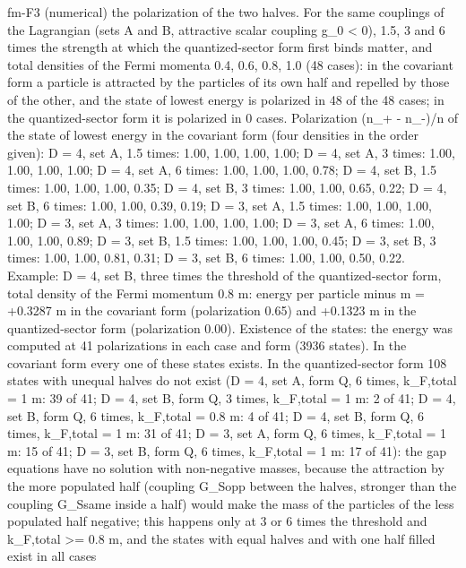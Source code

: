 \documentclass[
  10pt,
]{article}
\newenvironment{Shaded}{}{}
\newcommand{\NormalTok}[1]{#1}
\begin{document}
\begin{Shaded}
\begin{Highlighting}[]
\NormalTok{[PASS] fm{-}F3  (numerical) the polarization of the two halves. For the same couplings of the Lagrangian (sets A and B, attractive scalar coupling g\_0 \textless{} 0), 1.5, 3 and 6 times the strength at which the quantized{-}sector form first binds matter, and total densities of the Fermi momenta 0.4, 0.6, 0.8, 1.0 (48 cases): in the covariant form a particle is attracted by the particles of its own half and repelled by those of the other, and the state of lowest energy is polarized in 48 of the 48 cases; in the quantized{-}sector form it is polarized in 0 cases. Polarization (n\_+ {-} n\_{-})/n of the state of lowest energy in the covariant form (four densities in the order given): D = 4, set A, 1.5 times: 1.00, 1.00, 1.00, 1.00; D = 4, set A, 3 times: 1.00, 1.00, 1.00, 1.00; D = 4, set A, 6 times: 1.00, 1.00, 1.00, 0.78; D = 4, set B, 1.5 times: 1.00, 1.00, 1.00, 0.35; D = 4, set B, 3 times: 1.00, 1.00, 0.65, 0.22; D = 4, set B, 6 times: 1.00, 1.00, 0.39, 0.19; D = 3, set A, 1.5 times: 1.00, 1.00, 1.00, 1.00; D = 3, set A, 3 times: 1.00, 1.00, 1.00, 1.00; D = 3, set A, 6 times: 1.00, 1.00, 1.00, 0.89; D = 3, set B, 1.5 times: 1.00, 1.00, 1.00, 0.45; D = 3, set B, 3 times: 1.00, 1.00, 0.81, 0.31; D = 3, set B, 6 times: 1.00, 1.00, 0.50, 0.22. Example: D = 4, set B, three times the threshold of the quantized{-}sector form, total density of the Fermi momentum 0.8 m: energy per particle minus m = +0.3287 m in the covariant form (polarization 0.65) and +0.1323 m in the quantized{-}sector form (polarization 0.00). Existence of the states: the energy was computed at 41 polarizations in each case and form (3936 states). In the covariant form every one of these states exists. In the quantized{-}sector form 108 states with unequal halves do not exist (D = 4, set A, form Q, 6 times, k\_F,total = 1 m: 39 of}
\NormalTok{41; D = 4, set B, form Q, 3 times, k\_F,total = 1 m: 2 of 41; D = 4, set B, form Q, 6 times, k\_F,total = 0.8 m: 4 of 41; D = 4, set B, form Q, 6 times, k\_F,total = 1 m: 31 of 41; D = 3, set A, form Q, 6 times, k\_F,total = 1 m: 15 of 41; D = 3, set B, form Q, 6 times, k\_F,total = 1 m: 17 of 41): the gap equations have no solution with non{-}negative masses, because the attraction by the more populated half (coupling G\_Sopp between the halves, stronger than the coupling G\_Ssame inside a half) would make the mass of the particles of the less populated half negative; this happens only at 3 or 6 times the threshold and k\_F,total \textgreater{}= 0.8 m, and the states with equal halves and with one half filled exist in all cases}

\end{Highlighting}
\end{Shaded}
\end{document}
